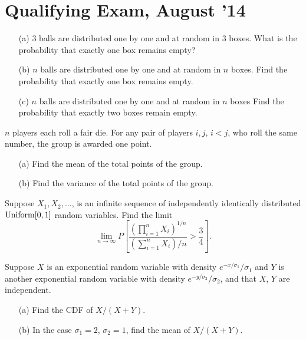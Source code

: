 \section{Qualifying Exam, August '14}
\begin{problem}
  \hfill
  \begin{itemize}[noitemsep]
  \item[(a)] \(3\) balls are distributed one by one and at random in \(3\)
    boxes. What is the probability that exactly one box remains empty?
  \item[(b)] \(n\) balls are distributed one by one and at random in \(n\)
    boxes. Find the probability that exactly one box remains empty.
  \item[(c)] \(n\) balls are distributed one by one and at random in \(n\)
    boxes Find the probability that exactly two boxes remain empty.
  \end{itemize}
\end{problem}
\begin{solution}
\end{solution}

\begin{problem}
  \(n\) players each roll a fair die. For any pair of players \(i,j\),
  \(i<j\), who roll the same number, the group is awarded one point.
  \begin{itemize}[noitemsep]
  \item[(a)] Find the mean of the total points of the group.
  \item[(b)] Find the variance of the total points of the group.
  \end{itemize}
\end{problem}
\begin{solution}
\end{solution}

\begin{problem}
  Suppose \(X_1,X_2,\dotsc\), is an infinite sequence of independently
  identically distributed \(\operatorname{Uniform}[0,1]\) random variables. Find the
  limit
  \[
    \lim_{n\to\infty} P%
    \left[%
      \frac{\left(\prod_{i=1}^n X_i\right)^{1/n}}
      {\left(\sum_{i=1}^nX_i\right)/n}>\frac{3}{4}%
    \right].
  \]
\end{problem}
\begin{solution}
\end{solution}

\begin{problem}
  Suppose \(X\) is an exponential random variable with density
  \(e^{-x/\sigma_1}/\sigma_1\) and \(Y\) is another exponential random
  variable with density \(e^{-y/\sigma_2}/\sigma_2\), and that \(X\), \(Y\)
  are independent.
  \begin{itemize}[noitemsep]
  \item[(a)] Find the CDF of \(X/(X+Y)\).
  \item[(b)] In the case \(\sigma_1=2\), \(\sigma_2=1\), find the mean of
    \(X/(X+Y)\).
  \end{itemize}
\end{problem}
\begin{solution}
\end{solution}


